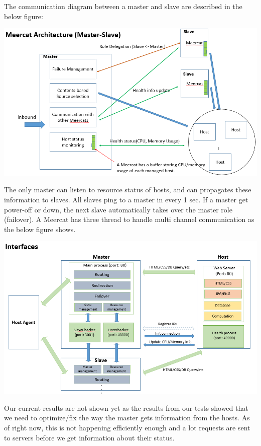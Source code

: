 \documentclass[11pt,letter]{article}
\begin{document}
The communication diagram between a master and slave are described in the below figure:
\begin{center}
	\includegraphics[scale=0.5]{./comm.png}
\end{center}

The only master can listen to resource status of hosts, and can propagates these information to slaves. All slaves ping to a master in every 1 sec. If a master get power-off or down, the next slave automatically takes over the master role (failover). A Meercat has three thread to handle multi channel communication as the below figure shows.
\begin{center}
	\includegraphics[scale=0.5]{./interface.png}
\end{center}

Our current results are not shown yet as the results from our tests showed that we need to optimize/fix the way the master gets information from the hosts. As of right now, this is not happening efficiently enough and a lot requests are sent to servers before we get information about their status.
 
\end{document}
